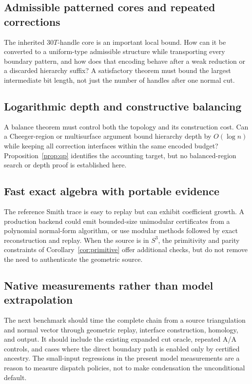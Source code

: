 \documentclass[11pt]{article}
\theoremstyle{definition}
\theoremstyle{remark}
\begin{document}
\subsection{Admissible patterned cores and repeated corrections}
The inherited $30T$-handle core is an important local bound. How can it be
converted to a uniform-type admissible structure while transporting every
boundary pattern, and how does that encoding behave after a weak reduction
or a discarded hierarchy suffix? A satisfactory theorem must bound the
largest intermediate bit length, not just the number of handles after one
normal cut.

\subsection{Logarithmic depth and constructive balancing}
A balance theorem must control both the topology and its construction cost.
Can a Cheeger-region or multisurface argument bound hierarchy depth by
$O(\log n)$ while keeping all correction interfaces within the same encoded
budget? Proposition~\ref{prop:qp} identifies the accounting target, but no
balanced-region search or depth proof is established here.

\subsection{Fast exact algebra with portable evidence}
The reference Smith trace is easy to replay but can exhibit coefficient
growth. A production backend could emit bounded-size unimodular certificates
from a polynomial normal-form algorithm, or use modular methods followed by
exact reconstruction and replay. When the source is in $S^3$, the primitivity
and parity constraints of Corollary~\ref{cor:primitive} offer additional
checks, but do not remove the need to authenticate the geometric source.

\subsection{Native measurements rather than model extrapolation}
The next benchmark should time the complete chain from a source
triangulation and normal vector through geometric replay, interface
construction, homology, and output. It should include the existing expanded
cut oracle, repeated A/A controls, and cases where the direct boundary path
is enabled only by certified ancestry. The small-input regressions in the
present model measurements are a reason to measure dispatch policies, not
to make condensation the unconditional default.
\end{document}
